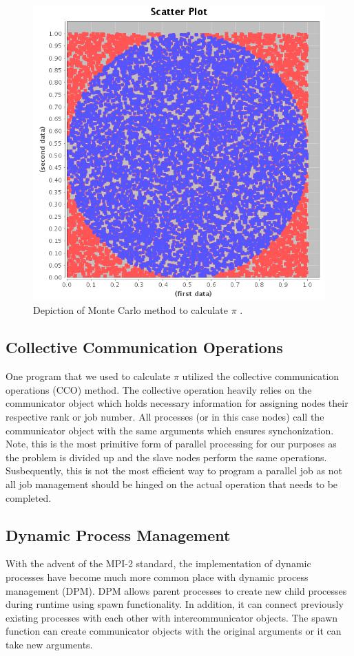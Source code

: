 \begin{figure}
\centering
\includegraphics[scale=0.4]{Figures/monte-carlo}
\decoRule
\caption[Monte-Carlo Method]{Depiction of Monte Carlo method to calculate $\pi$ .}
\label{fig:Monte-carlo}
\end{figure}

\subsection {Collective Communication Operations}

One program that we used to calculate $\pi$ utilized the collective communication operations (CCO) method. The collective operation heavily relies on the communicator object which holds necessary information for assigning nodes their respective rank or job number. All processes (or in this case nodes) call the communicator object with the same arguments which ensures synchonization. Note, this is the most primitive form of parallel processing for our purposes as the problem is divided up and the slave  nodes perform the same operations. Susbequently, this is not the most efficient way to program a parallel job as not all job management should be hinged on the actual operation that needs to be completed.


\subsection {Dynamic Process Management}
With the advent of the MPI-2 standard, the implementation of dynamic processes have become much more common place with dynamic process management (DPM). DPM allows parent processes to create new child processes during runtime using spawn functionality. In addition, it can connect previously existing processes with each other with intercommunicator objects. The spawn function can create communicator objects with the original arguments or it can take new arguments.

